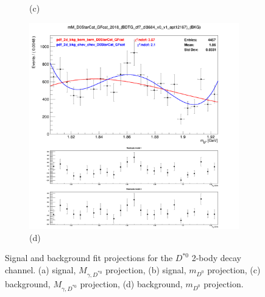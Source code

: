 \begin{figure}[!ht]
\begin{subfigure}[t]{0.50\mylength}
        \caption{\footnotesize (c)}
    \end{subfigure}%
    \begin{subfigure}[t]{0.50\mylength}
        \centering
        \includegraphics[width=0.45\mylength]{resources/plots/D0Star_2body_fit_BKG_MM.png}
        \caption{\footnotesize (d)}
    \end{subfigure}%
\caption{Signal and background fit projections for the $D^{*0}$ 2-body decay channel. (a) signal, $M_{\gamma, D^{*0}}$ projection, (b) signal, $m_{D^{0}}$ projection, (c) background, $M_{\gamma, D^{*0}}$ projection, (d) background, $m_{D^{0}}$ projection.}
\label{fig:sig_bkg_modelling_d0star_2body}
    \vspace*{-0.0cm}
\end{figure}


